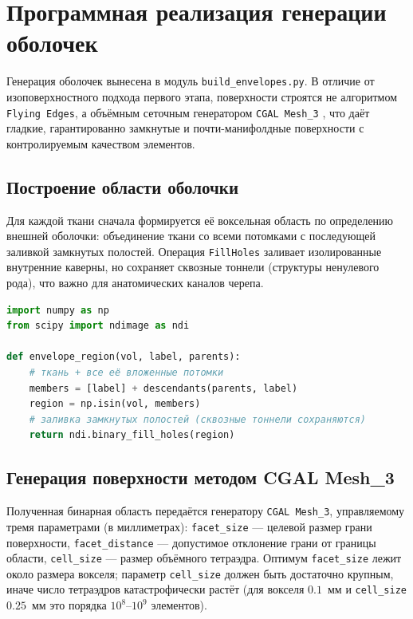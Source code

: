 \documentclass[a4paper,14pt]{article}
\begin{document}
\newpage
\section{Программная реализация генерации оболочек}

Генерация оболочек вынесена в модуль \texttt{build\_envelopes.py}. В отличие от изоповерхностного подхода первого этапа, поверхности строятся не алгоритмом \texttt{Flying Edges}, а объёмным сеточным генератором \texttt{CGAL Mesh\_3} \cite{cgal}, что даёт гладкие, гарантированно замкнутые и почти-манифолдные поверхности с контролируемым качеством элементов.

\subsection{Построение области оболочки}
Для каждой ткани сначала формируется её воксельная область по определению внешней оболочки: объединение ткани со всеми потомками с последующей заливкой замкнутых полостей. Операция \texttt{FillHoles} заливает изолированные внутренние каверны, но сохраняет сквозные тоннели (структуры ненулевого рода), что важно для анатомических каналов черепа.

\begin{lstlisting}[language=Python, caption={Формирование воксельной области оболочки ткани}]
import numpy as np
from scipy import ndimage as ndi

def envelope_region(vol, label, parents):
    # ткань + все её вложенные потомки
    members = [label] + descendants(parents, label)
    region = np.isin(vol, members)
    # заливка замкнутых полостей (сквозные тоннели сохраняются)
    return ndi.binary_fill_holes(region)
\end{lstlisting}

\subsection{Генерация поверхности методом CGAL Mesh\_3}
Полученная бинарная область передаётся генератору \texttt{CGAL Mesh\_3}, управляемому тремя параметрами (в миллиметрах): \texttt{facet\_size} --- целевой размер грани поверхности, \texttt{facet\_distance} --- допустимое отклонение грани от границы области, \texttt{cell\_size} --- размер объёмного тетраэдра. Оптимум \texttt{facet\_size} лежит около размера вокселя; параметр \texttt{cell\_size} должен быть достаточно крупным, иначе число тетраэдров катастрофически растёт (для вокселя $0.1$~мм и \texttt{cell\_size} $0.25$~мм это порядка $10^8$--$10^9$ элементов).
\end{document}
